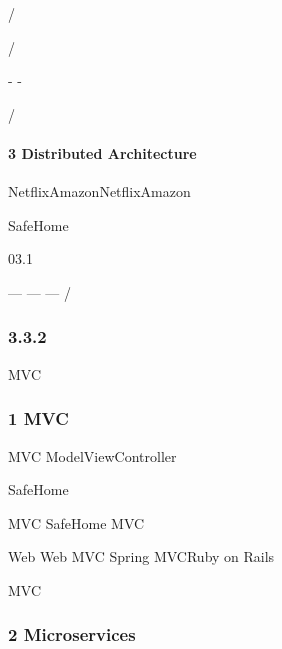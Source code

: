 /

\important{}

\important{}/

\important{} - -

\important{}

\important{}

\important{}/

\hypertarget{distributed-architecture}{%
\paragraph{3 Distributed Architecture}\label{distributed-architecture}}

\important{}

\important{}

\important{}

NetflixAmazonNetflixAmazon

SafeHome


03.1

\textbar---\textbar{} --- \textbar---\textbar{}
\textbar{}\important{}\textbar{} \important{}
\textbar{}\important{}\textbar{} \textbar\textbar{} \textbar\textbar{}
\textbar/\textbar{} \textbar\textbar{} \textbar\textbar{}
\textbar\textbar{}

\hypertarget{section-29}{%
\subsubsection{3.3.2}\label{section-29}}

MVC

\hypertarget{mvc}{%
\subsubsection{1 MVC}\label{mvc}}


MVC ModelViewController

SafeHome


MVC SafeHome MVC

Web Web MVC Spring MVCRuby on Rails


MVC

\hypertarget{microservices}{%
\subsubsection{2 Microservices}\label{microservices}}

